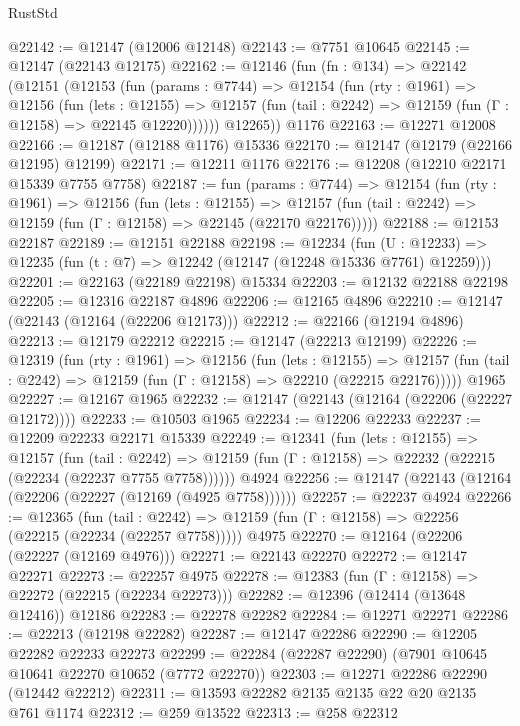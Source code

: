 \begin{lexlean}{RustStd}
\begin{coremodule}
@22142 := @12147 (@12006 @12148)
@22143 := @7751 @10645
@22145 := @12147 (@22143 @12175)
@22162 := @12146
    (fun (fn : @134) =>
    @22142
      (@12151
        (@12153
          (fun (params : @7744) =>
          @12154
            (fun (rty : @1961) =>
            @12156
              (fun (lets : @12155) =>
              @12157 (fun (tail : @2242) => @12159 (fun (Γ : @12158) => @22145 @12220))))))
        @12265))
    @1176
@22163 := @12271 @12008
@22166 := @12187 (@12188 @1176) @15336
@22170 := @12147 (@12179 (@22166 @12195) @12199)
@22171 := @12211 @1176
@22176 := @12208 (@12210 @22171 @15339 @7755 @7758)
@22187 := fun (params : @7744) =>
  @12154
    (fun (rty : @1961) =>
    @12156
      (fun (lets : @12155) =>
      @12157 (fun (tail : @2242) => @12159 (fun (Γ : @12158) => @22145 (@22170 @22176)))))
@22188 := @12153 @22187
@22189 := @12151 @22188
@22198 := @12234
    (fun (U : @12233) => @12235 (fun (t : @7) => @12242 (@12147 (@12248 @15336 @7761) @12259)))
@22201 := @22163 (@22189 @22198) @15334
@22203 := @12132 @22188 @22198
@22205 := @12316 @22187 @4896
@22206 := @12165 @4896
@22210 := @12147 (@22143 (@12164 (@22206 @12173)))
@22212 := @22166 (@12194 @4896)
@22213 := @12179 @22212
@22215 := @12147 (@22213 @12199)
@22226 := @12319
    (fun (rty : @1961) =>
    @12156
      (fun (lets : @12155) =>
      @12157 (fun (tail : @2242) => @12159 (fun (Γ : @12158) => @22210 (@22215 @22176)))))
    @1965
@22227 := @12167 @1965
@22232 := @12147 (@22143 (@12164 (@22206 (@22227 @12172))))
@22233 := @10503 @1965
@22234 := @12206 @22233
@22237 := @12209 @22233 @22171 @15339
@22249 := @12341
    (fun (lets : @12155) =>
    @12157
      (fun (tail : @2242) =>
      @12159 (fun (Γ : @12158) => @22232 (@22215 (@22234 (@22237 @7755 @7758))))))
    @4924
@22256 := @12147 (@22143 (@12164 (@22206 (@22227 (@12169 (@4925 @7758))))))
@22257 := @22237 @4924
@22266 := @12365
    (fun (tail : @2242) => @12159 (fun (Γ : @12158) => @22256 (@22215 (@22234 (@22257 @7758)))))
    @4975
@22270 := @12164 (@22206 (@22227 (@12169 @4976)))
@22271 := @22143 @22270
@22272 := @12147 @22271
@22273 := @22257 @4975
@22278 := @12383 (fun (Γ : @12158) => @22272 (@22215 (@22234 @22273)))
@22282 := @12396 (@12414 (@13648 @12416)) @12186
@22283 := @22278 @22282
@22284 := @12271 @22271
@22286 := @22213 (@12198 @22282)
@22287 := @12147 @22286
@22290 := @12205 @22282 @22233 @22273
@22299 := @22284 (@22287 @22290) (@7901 @10645 @10641 @22270 @10652 (@7772 @22270))
@22303 := @12271 @22286 @22290 (@12442 @22212)
@22311 := @13593 @22282 @2135 @2135 @22 @20 @2135 @761 @1174
@22312 := @259 @13522
@22313 := @258 @22312

\end{coremodule}
\end{lexlean}
